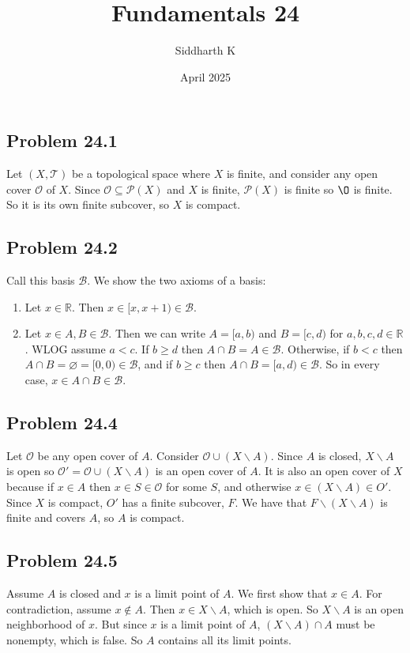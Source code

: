 \documentclass{article}
\title{Fundamentals 24}
\author{Siddharth K}
\date{April 2025}
\newcommand{\R}{\mathbb{R}}
\newcommand{\power}{\mathcal{P}}
\newcommand{\T}{\mathcal{T}}
\newcommand{\B}{\mathcal{B}}
\newcommand{\mcO}{\mathcal{O}}
\newcommand{\nullset}{\varnothing}
\newcommand{\minus}{\backslash}
\begin{document}
\maketitle

\subsection*{Problem 24.1}
Let $(X, \T)$ be a topological space where $X$ is finite, and consider any open cover $\mcO$ of $X$. Since $\mcO \subseteq \power(X)$ and $X$ is finite, $\power(X)$ is finite so $\O$ is finite. So it is its own finite subcover, so $X$ is compact.

\subsection*{Problem 24.2}
Call this basis $\B$. We show the two axioms of a basis:

\begin{enumerate}
    \item Let $x \in \R$. Then $x \in [x, x + 1) \in \B$.
    \item Let $x \in A, B \in \B$. Then we can write $A = [a, b)$ and $B = [c, d)$ for $a, b, c, d \in \R$. WLOG assume $a < c$. If $b \ge d$ then $A \cap B = A \in \B$. Otherwise, if $b < c$ then $A \cap B = \nullset = [0, 0) \in \B$, and if $b \ge c$ then $A \cap B = [a, d) \in \B$. So in every case, $x \in A \cap B \in \B$.
\end{enumerate}

\subsection*{Problem 24.4}
Let $\mcO$ be any open cover of $A$. Consider $\mcO \cup (X\minus A)$. Since $A$ is closed, $X \minus A$ is open so $\mcO' = \mcO \cup (X\minus A)$ is an open cover of $A$. It is also an open cover of $X$ because if $x \in A$ then $x \in S \in \mcO$ for some $S$, and otherwise $x \in (X\minus A) \in O'$. Since $X$ is compact, $O'$ has a finite subcover, $F$. We have that $F \minus (X \minus A)$ is finite and covers $A$, so $A$ is compact.

\subsection*{Problem 24.5}
Assume $A$ is closed and $x$ is a limit point of $A$. We first show that $x \in A$. For contradiction, assume $x \not\in A$. Then $x \in X \minus A$, which is open. So $X \minus A$ is an open neighborhood of $x$. But since $x$ is a limit point of $A$, $(X \minus A) \cap A$ must be nonempty, which is false. So $A$ contains all its limit points. \\
\end{document}
